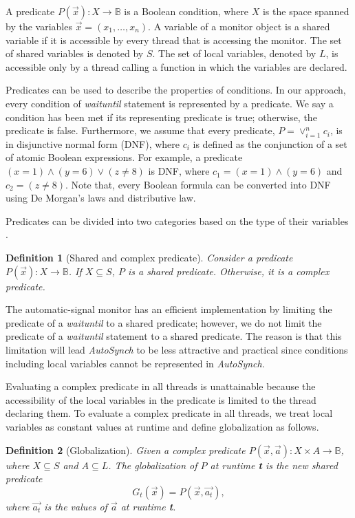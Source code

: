 \documentclass{sigplanconf}
\newtheorem{definition}{Definition}
\begin{document}
A predicate $P(\vec{x}): X \rightarrow \mathbb{B}$ is a Boolean condition, 
where $X$ is the space spanned by the variables $\vec{x}=(x_1, \dots, x_n)$. 
A variable of a monitor object is a shared variable if it is accessible by every 
thread that is accessing the monitor. The set of shared variables is denoted by 
$S$. The set of local variables, denoted by $L$, is 
accessible only by a thread calling a function in which the variables are declared. 

Predicates can be used to describe the properties of conditions. In our
approach,
every condition of {\em waituntil} statement is represented by a predicate. We say
a condition has been met if its representing predicate is true; otherwise, the
predicate is false. 
Furthermore, we assume that every predicate, $P = \vee_{i=1}^nc_i$, is in 
disjunctive normal form (DNF), where $c_i$ is defined as the conjunction of a 
set of atomic Boolean expressions. For example, a predicate $(x = 1) \wedge 
(y = 6) \vee (z \ne 8)$ is DNF, where $c_1 = (x = 1) \wedge (y = 6)$ and $c_2 = 
(z \ne 8)$. Note that, every Boolean formula can be converted into DNF using 
De Morgan's laws and distributive law. 

Predicates can be divided into two categories based on the type of their 
variables \cite{bh05}.
\begin{definition}[Shared and complex predicate]
    Consider a predicate $P(\vec{x}): X \rightarrow \mathbb{B}$. If $X 
    \subseteq S$, $P$ 
    is a shared predicate. Otherwise, it
    is a complex predicate. 
\end{definition}

The automatic-signal monitor has an efficient implementation \cite{kes77} by 
limiting the predicate of a {\em waituntil} to a shared predicate; however, 
we do not limit the predicate of a {\em waituntil} statement to a shared
predicate. The reason is that this limitation will lead {\em AutoSynch} to be less
attractive and practical since conditions including local variables cannot be 
represented in {\em AutoSynch}.

Evaluating a complex predicate in all threads is unattainable 
because the accessibility of the local variables in the predicate is limited 
to the thread declaring them. To evaluate a complex predicate in all 
threads, we treat local variables as constant values at runtime and define 
globalization as follows. 
\begin{definition}[Globalization]
    Given a complex predicate $P(\vec{x}, \vec{a}): X \times A \rightarrow 
    \mathbb{B}$, where $X \subseteq S$ and $A \subseteq L$. The globalization 
    of $P$ at runtime {\textbf t} is the new shared predicate
    \[
    G_t(\vec{x}) = P(\vec{x}, \vec{a_t}),
    \]
    where $\vec{a_t}$ is the values of $\vec{a}$ at runtime {\textbf t}. 
\end{definition}
\end{document}
